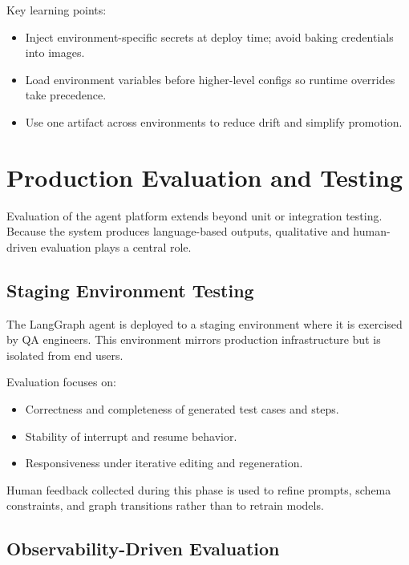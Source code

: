 Key learning points:
\begin{itemize}
      \item Inject environment-specific secrets at deploy time; avoid baking credentials into images.
      \item Load environment variables before higher-level configs so runtime overrides take precedence.
      \item Use one artifact across environments to reduce drift and simplify promotion.
\end{itemize}

\section{Production Evaluation and Testing}
\label{sec:ProductionEvaluation}

Evaluation of the agent platform extends beyond unit or integration testing.
Because the system produces language-based outputs, qualitative and
human-driven evaluation plays a central role.

\subsection{Staging Environment Testing}
\label{sec:StagingTesting}

The LangGraph agent is deployed to a staging environment where it is exercised
by QA engineers. This environment mirrors production infrastructure but is
isolated from end users.

Evaluation focuses on:

\begin{itemize}
      \item Correctness and completeness of generated test cases and steps.
      \item Stability of interrupt and resume behavior.
      \item Responsiveness under iterative editing and regeneration.
\end{itemize}

Human feedback collected during this phase is used to refine prompts, schema
constraints, and graph transitions rather than to retrain models.

\subsection{Observability-Driven Evaluation}
\label{sec:ObservabilityEvaluation}

